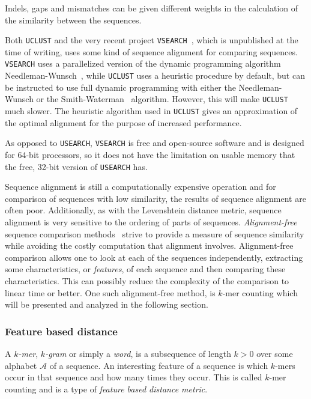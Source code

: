 Indels, gaps and mismatches can be given different weights in the calculation
of the similarity between the sequences.

Both \texttt{UCLUST} and the very recent project
\texttt{VSEARCH}~\cite{vsearch}, which is unpublished at the time of writing,
uses some kind of sequence alignment for comparing sequences. \texttt{VSEARCH}
uses a parallelized version of the dynamic programming algorithm
Needleman-Wunsch~\cite{needleman}, while \texttt{UCLUST} uses a heuristic
procedure by default, but can be instructed to use full dynamic programming
with either the Needleman-Wunsch or the Smith-Waterman~\cite{smith} algorithm.
However, this will make \texttt{UCLUST} much slower. The heuristic algorithm
used in \texttt{UCLUST} gives an approximation of the optimal alignment for the
purpose of increased performance.

As opposed to \texttt{USEARCH}, \texttt{VSEARCH} is free and open-source
software and is designed for 64-bit processors, so it does not have the
limitation on usable memory that the free, 32-bit version of \texttt{USEARCH}
has.


Sequence alignment is still a computationally expensive operation and for
comparison of sequences with low similarity, the results of sequence alignment
are often poor. Additionally, as with the Levenshtein distance metric,
sequence alignment is very sensitive to the ordering of parts of sequences.
\emph{Alignment-free} sequence comparison methods~\cite{vinga} strive to
provide a measure of sequence similarity while avoiding the costly computation
that alignment involves. Alignment-free comparison allows one to look at each
of the sequences independently, extracting some characteristics, or
\emph{features}, of each sequence and then comparing these characteristics.
This can possibly reduce the complexity of the comparison to linear time or
better. One such alignment-free method, is $k$-mer counting which will be
presented and analyzed in the following section.


\subsubsection{Feature based distance} \label{sec:kmer_distance}

A \emph{$k$-mer}, \emph{$k$-gram} or simply a \emph{word}, is a subsequence
of length $k>0$ over some alphabet $\mathcal{A}$ of a sequence. An interesting
feature of a sequence is which $k$-mers occur in that sequence and how many
times they occur. This is called $k$-mer counting and is a type of
\emph{feature based distance metric}.

